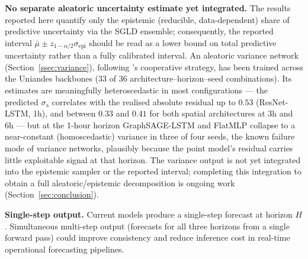 \textbf{No separate aleatoric uncertainty estimate yet integrated.} The
results reported here quantify only the epistemic (reducible,
data-dependent) share of predictive uncertainty via the SGLD ensemble;
consequently, the reported interval $\bar\mu \pm z_{1-\alpha/2}\sigma_\text{epi}$
should be read as a lower bound on total predictive uncertainty rather than
a fully calibrated interval. An aleatoric variance network
(Section~\ref{ssec:variance}), following \citet{yi2025cooperative}'s
cooperative strategy, has been trained across the Uniandes backbones (33 of
36 architecture--horizon--seed combinations). Its estimates are meaningfully
heteroscedastic in most configurations --- the predicted $\sigma_\text{a}$
correlates with the realised absolute residual up to $0.53$ (ResNet-LSTM,
1h), and between $0.33$ and $0.41$ for both spatial architectures at 3h and
6h --- but at the 1-hour horizon GraphSAGE-LSTM and FlatMLP collapse to a
near-constant (homoscedastic) variance in three of four seeds, the known
failure mode of variance networks, plausibly because the point model's
residual carries little exploitable signal at that horizon. The variance
output is not yet integrated into the epistemic sampler or the reported
interval; completing this integration to obtain a full aleatoric/epistemic
decomposition is ongoing work (Section~\ref{sec:conclusion}).

\textbf{Single-step output.} Current models produce a single-step forecast at
horizon $H$. Simultaneous multi-step output (forecasts for all three horizons
from a single forward pass) could improve consistency and reduce inference cost
in real-time operational forecasting pipelines.
